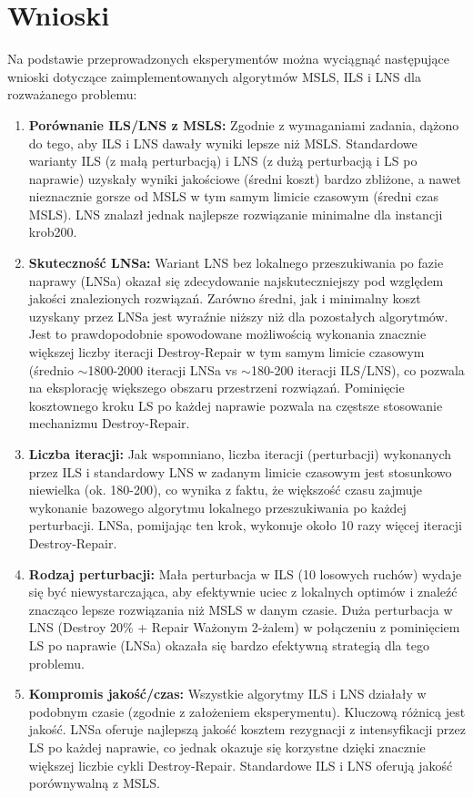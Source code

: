 \documentclass[12pt,a4paper]{article}
\begin{document}
\section{Wnioski}
Na podstawie przeprowadzonych eksperymentów można wyciągnąć następujące wnioski dotyczące zaimplementowanych algorytmów MSLS, ILS i LNS dla rozważanego problemu:

\begin{enumerate}
    \item \textbf{Porównanie ILS/LNS z MSLS:} Zgodnie z wymaganiami zadania, dążono do tego, aby ILS i LNS dawały wyniki lepsze niż MSLS. Standardowe warianty ILS (z małą perturbacją) i LNS (z dużą perturbacją i LS po naprawie) uzyskały wyniki jakościowe (średni koszt) bardzo zbliżone, a nawet nieznacznie gorsze od MSLS w tym samym limicie czasowym (średni czas MSLS). LNS znalazł jednak najlepsze rozwiązanie minimalne dla instancji krob200.

    \item \textbf{Skuteczność LNSa:} Wariant LNS bez lokalnego przeszukiwania po fazie naprawy (LNSa) okazał się zdecydowanie najskuteczniejszy pod względem jakości znalezionych rozwiązań. Zarówno średni, jak i minimalny koszt uzyskany przez LNSa jest wyraźnie niższy niż dla pozostałych algorytmów. Jest to prawdopodobnie spowodowane możliwością wykonania znacznie większej liczby iteracji Destroy-Repair w tym samym limicie czasowym (średnio $\sim$1800-2000 iteracji LNSa vs $\sim$180-200 iteracji ILS/LNS), co pozwala na eksplorację większego obszaru przestrzeni rozwiązań. Pominięcie kosztownego kroku LS po każdej naprawie pozwala na częstsze stosowanie mechanizmu Destroy-Repair.

    \item \textbf{Liczba iteracji:} Jak wspomniano, liczba iteracji (perturbacji) wykonanych przez ILS i standardowy LNS w zadanym limicie czasowym jest stosunkowo niewielka (ok. 180-200), co wynika z faktu, że większość czasu zajmuje wykonanie bazowego algorytmu lokalnego przeszukiwania po każdej perturbacji. LNSa, pomijając ten krok, wykonuje około 10 razy więcej iteracji Destroy-Repair.

    \item \textbf{Rodzaj perturbacji:} Mała perturbacja w ILS (10 losowych ruchów) wydaje się być niewystarczająca, aby efektywnie uciec z lokalnych optimów i znaleźć znacząco lepsze rozwiązania niż MSLS w danym czasie. Duża perturbacja w LNS (Destroy 20\% + Repair Ważonym 2-żalem) w połączeniu z pominięciem LS po naprawie (LNSa) okazała się bardzo efektywną strategią dla tego problemu.

    \item \textbf{Kompromis jakość/czas:} Wszystkie algorytmy ILS i LNS działały w podobnym czasie (zgodnie z założeniem eksperymentu). Kluczową różnicą jest jakość. LNSa oferuje najlepszą jakość kosztem rezygnacji z intensyfikacji przez LS po każdej naprawie, co jednak okazuje się korzystne dzięki znacznie większej liczbie cykli Destroy-Repair. Standardowe ILS i LNS oferują jakość porównywalną z MSLS.

\end{enumerate}
\end{document}
